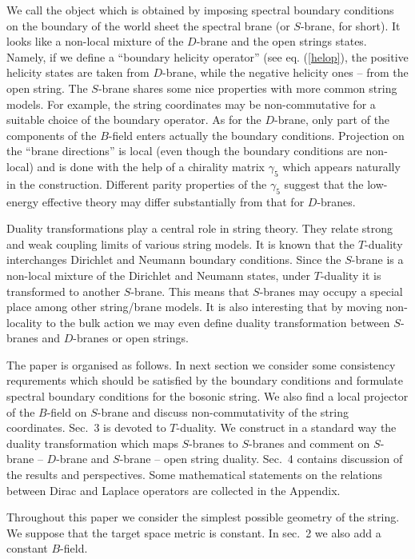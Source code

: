 \documentclass[a4paper,12pt,twoside]{article}
\begin{document}
We call the object which is obtained by imposing spectral
boundary conditions on the boundary of the world sheet 
the spectral brane (or $S$-brane, for short). It
looks like a non-local mixture of the $D$-brane and the
open strings states. Namely, if we define a ``boundary helicity
operator'' (see eq. (\ref{helop}), the positive helicity
states are taken from $D$-brane, while the negative helicity
ones -- from the open string. The $S$-brane
shares some nice properties with more common string
models. For example, the string coordinates may be non-commutative
for a suitable choice of the boundary operator. As for the
$D$-brane, only part of the components of the $B$-field
enters actually the boundary conditions. Projection on
the ``brane directions'' is local (even though the boundary
conditions are non-local) and is done with the help
of a chirality matrix $\gamma_5$ which appears naturally
in the construction. Different parity properties of the $\gamma_5$
suggest that the low-energy effective theory may differ 
substantially from that for $D$-branes.

Duality transformations play a central role in string
theory. They relate strong and weak coupling limits of
various string models.
It is known that the $T$-duality interchanges
Dirichlet and Neumann boundary conditions. Since the $S$-brane is
a non-local mixture of the Dirichlet and Neumann states,
under $T$-duality it is transformed to another $S$-brane.
This means that $S$-branes may occupy a special place among
other string/brane models. It is also interesting that
by moving non-locality to the bulk action we may even
define duality transformation between $S$-branes and
$D$-branes or open strings.

The paper is organised as follows. In next section we consider
some consistency requrements which should be satisfied by
the boundary conditions and formulate spectral boundary
conditions for the bosonic string. We also find a local
projector of the $B$-field on $S$-brane and discuss non-commutativity
of the string coordinates. Sec.~3 is devoted to $T$-duality.
We construct in a standard way the duality transformation
which maps $S$-branes to $S$-branes and comment on $S$-brane --
$D$-brane and $S$-brane -- open string duality. Sec.~4 contains
discussion of the results and perspectives. Some mathematical
statements on the relations between Dirac and Laplace operators are 
collected in the Appendix. 

Throughout this paper we consider the simplest possible
geometry of the string. We suppose that the target
space metric is constant. In sec.~2 we also add a constant
$B$-field.
\end{document}
